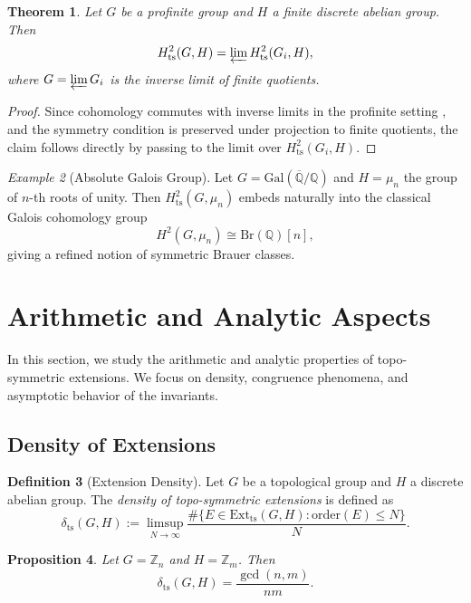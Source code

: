 \documentclass[11pt,a4paper]{article}
\theoremstyle{plain}
\newtheorem{theorem}{Theorem}[section]
\newtheorem{proposition}[theorem]{Proposition}
\theoremstyle{definition}
\newtheorem{definition}[theorem]{Definition}
\theoremstyle{remark}
\newtheorem{example}[theorem]{Example}
\begin{document}
	\begin{theorem}
		Let $G$ be a profinite group and $H$ a finite discrete abelian group.  
		Then
		\[
		H^2_{\mathrm{ts}}(G,H) = \varprojlim H^2_{\mathrm{ts}}(G_i,H),
		\]
		where $G = \varprojlim G_i$ is the inverse limit of finite quotients.
	\end{theorem}
	
	\begin{proof}
		Since cohomology commutes with inverse limits in the profinite setting \cite{Serre1979},  
		and the symmetry condition is preserved under projection to finite quotients,  
		the claim follows directly by passing to the limit over $H^2_{\mathrm{ts}}(G_i,H)$.  
	\end{proof}
	
	\begin{example}[Absolute Galois Group]
		Let $G = \mathrm{Gal}(\overline{\mathbb{Q}}/\mathbb{Q})$ and $H = \mu_n$ the group of $n$-th roots of unity.  
		Then $H^2_{\mathrm{ts}}(G,\mu_n)$ embeds naturally into the classical Galois cohomology group
		\[
		H^2(G,\mu_n) \cong \mathrm{Br}(\mathbb{Q})[n],
		\]
		giving a refined notion of symmetric Brauer classes.  
	\end{example}
	
	\section{Arithmetic and Analytic Aspects}
	
	In this section, we study the arithmetic and analytic properties of topo-symmetric extensions.  
	We focus on density, congruence phenomena, and asymptotic behavior of the invariants.
	
	\subsection{Density of Extensions}
	
	\begin{definition}[Extension Density]
		Let $G$ be a topological group and $H$ a discrete abelian group.  
		The \emph{density of topo-symmetric extensions} is defined as
		\[
		\delta_{\mathrm{ts}}(G,H) := \limsup_{N\to\infty} \frac{\#\{ E \in \mathrm{Ext}_{\mathrm{ts}}(G,H) : \text{order}(E) \le N\}}{N}.
		\]
	\end{definition}
	
	\begin{proposition}
		Let $G = \mathbb{Z}_n$ and $H = \mathbb{Z}_m$.  
		Then
		\[
		\delta_{\mathrm{ts}}(G,H) = \frac{\gcd(n,m)}{nm}.
		\]
	\end{proposition}
	
\end{document}
